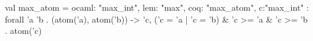 val max_atom = {ocaml: "max_int", lem: "max", coq: "max_atom", c:"max_int"} : forall 'a 'b . (atom('a), atom('b)) -> {'c, ('c = 'a | 'c = 'b) & 'c >= 'a & 'c >= 'b . atom('c)}
